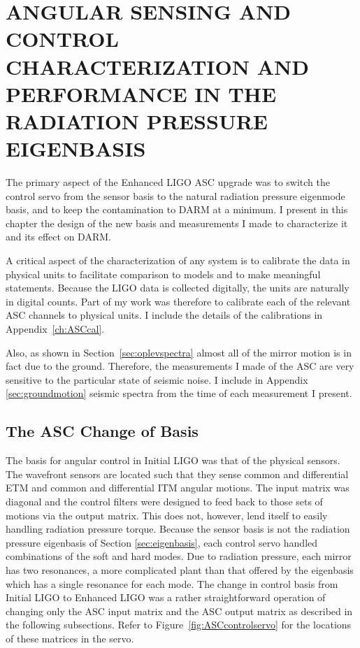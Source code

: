 \chapter{ANGULAR SENSING AND CONTROL CHARACTERIZATION AND PERFORMANCE
  IN THE RADIATION PRESSURE EIGENBASIS}
\label{ch:characterization}





The primary aspect of the Enhanced LIGO ASC upgrade was to switch the
control servo from the sensor basis to the natural radiation pressure
eigenmode basis, and to keep the contamination to DARM at a minimum. I
present in this chapter the design of the new basis and measurements I
made to characterize it and its effect on DARM.

A critical aspect of the characterization of any system is to
calibrate the data in physical units to facilitate comparison to
models and to make meaningful statements. Because the LIGO data is
collected digitally, the units are naturally in digital counts. Part
of my work was therefore to calibrate each of the relevant ASC
channels to physical units. I include the details of the calibrations
in Appendix~\ref{ch:ASCcal}.

Also, as shown in Section~\ref{sec:oplevspectra} almost all of the mirror
motion is in fact due to the ground. Therefore, the measurements I
made of the ASC are very sensitive to the particular state of seismic
noise. I include in Appendix \ref{sec:groundmotion} seismic spectra
from the time of each measurement I present.


\section{The ASC Change of Basis}
The basis for angular control in Initial LIGO was that of the physical
sensors. The wavefront sensors are located such that they sense common
and differential ETM and common and differential ITM angular
motions. The input matrix was diagonal and the control filters were
designed to feed back to those sets of motions via the output
matrix. This does not, however, lend itself to easily handling
radiation pressure torque. Because the sensor basis is not the
radiation pressure eigenbasis of Section \ref{sec:eigenbasis}, each
control servo handled combinations of the soft and hard modes. Due to
radiation pressure, each mirror has two resonances, a more complicated
plant than that offered by the eigenbasis which has a single resonance
for each mode.  The change in control basis from Initial LIGO to
Enhanced LIGO was a rather straightforward operation of changing only
the ASC input matrix and the ASC output matrix as described in the
following subsections. Refer to Figure~\ref{fig:ASCcontrolservo} for
the locations of these matrices in the servo.

